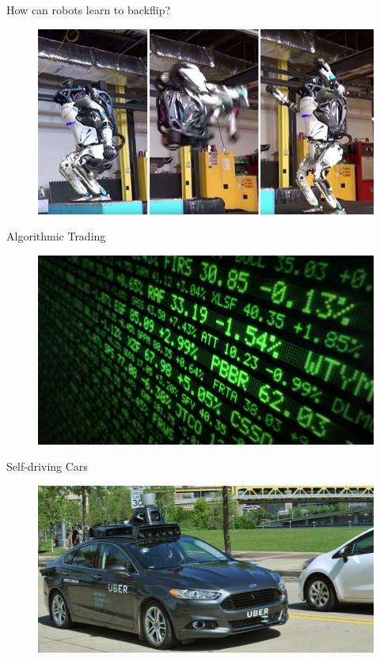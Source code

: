 \begin{frame}{How can robots learn to backflip?}

	\begin{figure}
		\centering
		\includegraphics[width=0.7\linewidth]{Images/atlas}
	\end{figure}
\end{frame}



\begin{frame}{Algorithmic Trading}
	\begin{figure}
		\centering
		\includegraphics[width=0.7\linewidth]{Images/stocks}
	\end{figure}
\end{frame}

\begin{frame}{Self-driving Cars}
	\begin{figure}
		\centering
		\includegraphics[width=0.7\linewidth]{Images/uber}
	\end{figure}
\end{frame}



